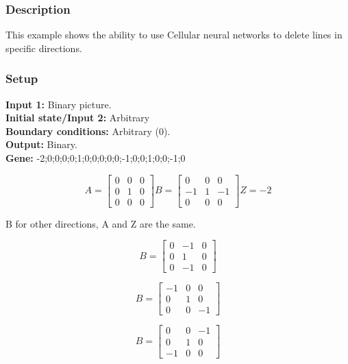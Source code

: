 \subsubsection{Description}
This example shows the ability to use Cellular neural networks to delete lines in specific directions. 
\subsubsection{Setup}

\textbf{Input 1:} Binary picture.\\
\textbf{Initial state/Input 2:} Arbitrary\\
\textbf{Boundary conditions:} Arbitrary (0).\\
\textbf{Output:} Binary.\\
\textbf{Gene:} -2;0;0;0;0;1;0;0;0;0;0;-1;0;0;1;0;0;-1;0\\
\begin{minipage}{1\linewidth}
\begin{equation}
A =
\begin{bmatrix}
 0 & 0 & 0 \\
 0 & 1 & 0 \\
 0 & 0 & 0
\end{bmatrix}
B =
\begin{bmatrix}
 0 & 0 & 0 \\
 -1 & 1 & -1 \\
 0 & 0 & 0
\end{bmatrix}
Z = -2
\end{equation}
\end{minipage}
B for other directions, A and Z are the same.\\
\begin{minipage}{0.33\linewidth}
\begin{equation}
B =
\begin{bmatrix}
 0 & -1 & 0 \\
 0 & 1 & 0 \\
 0 & -1 & 0
\end{bmatrix}
\end{equation}
\end{minipage}
\begin{minipage}{0.33\linewidth}
\begin{equation}
B =
\begin{bmatrix}
 -1 & 0 & 0 \\
 0 & 1 & 0 \\
 0 & 0 & -1
\end{bmatrix}
\end{equation}
\end{minipage}
\begin{minipage}{0.33\linewidth}
\begin{equation}
B =
\begin{bmatrix}
 0 & 0 & -1 \\
 0 & 1 & 0 \\
 -1 & 0 & 0
\end{bmatrix}
\end{equation}
\end{minipage}

